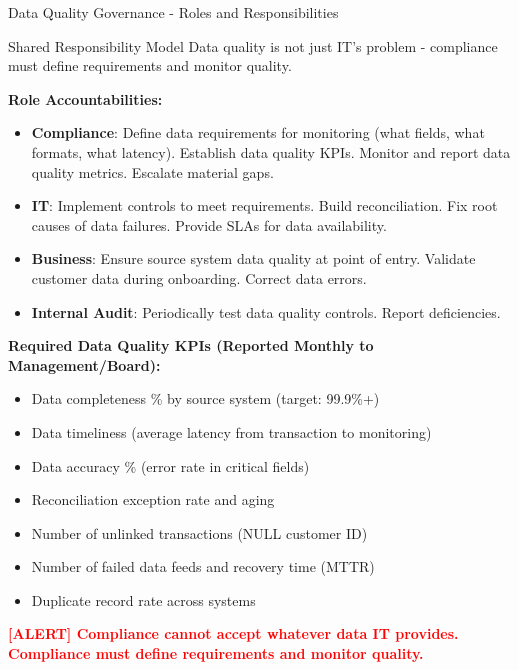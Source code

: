\documentclass[11pt,a4paper]{beamer}
\newcommand{\redflag}[1]{\textcolor{red}{\textbf{[ALERT] #1}}}
\begin{document}
\begin{frame}{Data Quality Governance - Roles and Responsibilities}
	\begin{block}{Shared Responsibility Model}
		Data quality is not just IT's problem - compliance must define requirements and monitor quality.
	\end{block}
	\textbf{Role Accountabilities:}
	\begin{itemize}
		\item \textbf{Compliance}: Define data requirements for monitoring (what fields, what formats, what latency). Establish data quality KPIs. Monitor and report data quality metrics. Escalate material gaps.
		\item \textbf{IT}: Implement controls to meet requirements. Build reconciliation. Fix root causes of data failures. Provide SLAs for data availability.
		\item \textbf{Business}: Ensure source system data quality at point of entry. Validate customer data during onboarding. Correct data errors.
		\item \textbf{Internal Audit}: Periodically test data quality controls. Report deficiencies.
	\end{itemize}
	\textbf{Required Data Quality KPIs (Reported Monthly to Management/Board):}
	\begin{itemize}
		\item Data completeness \% by source system (target: 99.9\%+)
		\item Data timeliness (average latency from transaction to monitoring)
		\item Data accuracy \% (error rate in critical fields)
		\item Reconciliation exception rate and aging
		\item Number of unlinked transactions (NULL customer ID)
		\item Number of failed data feeds and recovery time (MTTR)
		\item Duplicate record rate across systems
	\end{itemize}
	\redflag{Compliance cannot accept whatever data IT provides. Compliance must define requirements and monitor quality.}
\end{frame}
\end{document}
